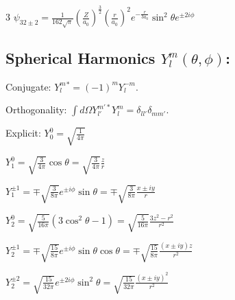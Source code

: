 \documentclass[10pt,a4paper]{article}
\begin{document}
\begin{multicols*}{3}
$\psi_{32\pm2} = \frac{1}{162\sqrt{\pi}} \left(\frac{Z}{a_0}\right)^{\frac{3}{2}} \left(\frac{r}{a_0}\right)^2 e^{-\frac{r}{3a_0}} \sin^2\theta e^{\pm 2i\phi}$


\subsection*{Spherical Harmonics $Y_l^m(\theta,\phi)$:}

Conjugate: $Y_l^m{}^* = (-1)^m Y_l^{-m}$. 

Orthogonality: $\int d\Omega Y_{l'}^{m'*} Y_l^m = \delta_{ll'} \delta_{mm'}$.

Explicit:
$Y_0^0 = \sqrt{\frac{1}{4\pi}}$

$Y_1^0 = \sqrt{\frac{3}{4\pi}}\cos\theta = \sqrt{\frac{3}{4\pi}}\frac{z}{r}$

$Y_1^{\pm 1} = \mp\sqrt{\frac{3}{8\pi}}e^{\pm i\phi}\sin\theta = \mp\sqrt{\frac{3}{8\pi}}\frac{x\pm iy}{r}$

$Y_2^0 = \sqrt{\frac{5}{16\pi}}(3\cos^2\theta-1) = \sqrt{\frac{5}{16\pi}}\frac{3z^2-r^2}{r^2}$

$Y_2^{\pm 1} = \mp\sqrt{\frac{15}{8\pi}}e^{\pm i\phi}\sin\theta\cos\theta = \mp\sqrt{\frac{15}{8\pi}}\frac{(x\pm iy)z}{r^2}$

$Y_2^{\pm 2} = \sqrt{\frac{15}{32\pi}}e^{\pm 2i\phi}\sin^2\theta = \sqrt{\frac{15}{32\pi}}\frac{(x\pm iy)^2}{r^2}$

\end{multicols*}
\end{document}
